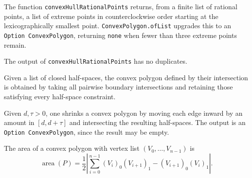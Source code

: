 \begin{definition}
  \label{def:convexHullRationalPoints}
  The function \texttt{convexHullRationalPoints} returns, from a finite
  list of rational points, a list of extreme points in counterclockwise
  order starting at the lexicographically smallest point.
  \texttt{ConvexPolygon.ofList} upgrades this to an \texttt{Option
  ConvexPolygon}, returning \texttt{none} when fewer than three extreme
  points remain.
\end{definition}

\begin{lemma}
  \label{lem:convexHullRationalPoints-nodup}
  The output of \texttt{convexHullRationalPoints} has no duplicates.
\end{lemma}

\begin{definition}
  \label{def:ofHalfSpaces}
  \leanok
  Given a list of closed half-spaces, the convex polygon defined by their
  intersection is obtained by taking all pairwise boundary intersections
  and retaining those satisfying every half-space constraint.
\end{definition}

\begin{definition}
  \label{def:shrink}
  \leanok
  Given $d, \tau > 0$, one shrinks a convex polygon by moving each edge
  inward by an amount in $[d, d + \tau]$ and intersecting the resulting
  half-spaces. The output is an \texttt{Option ConvexPolygon}, since the
  result may be empty.
\end{definition}

\begin{definition}
  \label{def:shoelace}
  \leanok
  The area of a convex polygon with vertex list $(V_0, \ldots, V_{n-1})$
  is
  \[
    \operatorname{area}(P) = \frac{1}{2}
    \left| \sum_{i=0}^{n-1} (V_i)_0 (V_{i+1})_1 - (V_{i+1})_0 (V_i)_1 \right|.
  \]
\end{definition}


